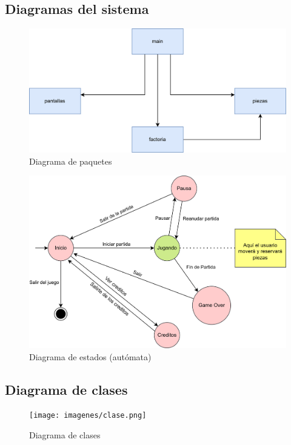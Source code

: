 \documentclass{article}
\begin{document}
\subsection{Diagramas del sistema}
\begin{figure}[H]
        \includegraphics[width=\textwidth]{imagenes/paquetes.png}
        \caption{Diagrama de paquetes}
\end{figure}

\begin{figure}[H]
        \includegraphics[width=\textwidth]{imagenes/estados.png}
        \caption{Diagrama de estados (autómata)}
\end{figure}

\subsection{Diagrama de clases}
\begin{figure}[H]
        \texttt{[image: imagenes/clase.png]}
        \caption{Diagrama de clases}
\end{figure}
\end{document}

